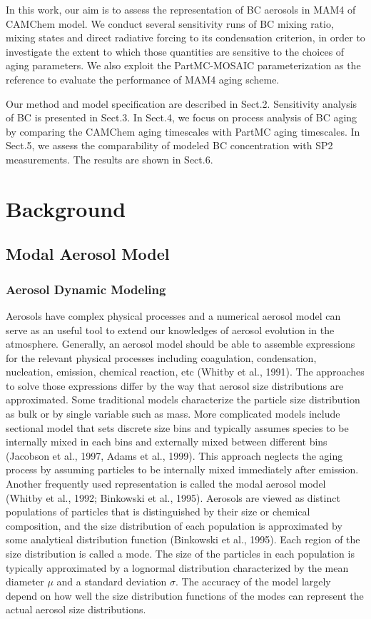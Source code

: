 \documentclass[12pt]{article}
\begin{document}
	In this work, our aim is to assess the representation of BC aerosols in MAM4 of CAMChem model. We conduct several sensitivity runs of BC mixing ratio, mixing states and direct radiative forcing to its condensation criterion, in order to investigate the extent to which those quantities are sensitive to the choices of aging parameters. We also exploit the PartMC-MOSAIC parameterization as the reference to evaluate the performance of MAM4 aging scheme. 

	Our method and model specification are described in Sect.2. Sensitivity analysis of BC is presented in Sect.3. In Sect.4, we focus on process analysis of BC aging by comparing the CAMChem aging timescales with PartMC aging timescales. In Sect.5, we assess the comparability of modeled BC concentration with SP2 measurements. The results are shown in Sect.6. 

	\section{Background}
	
	\subsection{Modal Aerosol Model}
	\subsubsection{Aerosol Dynamic Modeling}
	Aerosols have complex physical processes and a numerical aerosol model can serve as an useful tool to extend our knowledges of aerosol evolution in the atmosphere. Generally, an aerosol model should be able to assemble expressions for the relevant physical processes including coagulation, condensation, nucleation, emission, chemical reaction, etc (Whitby et al., 1991). The approaches to solve those expressions differ by the way that aerosol size distributions are approximated. Some traditional models characterize the particle size distribution as bulk or by single variable such as mass. More complicated models include sectional model that sets discrete size bins and typically assumes species to be internally mixed in each bins and externally mixed between different bins (Jacobson et al., 1997, Adams et al., 1999). This approach neglects the aging process by assuming particles to be internally mixed immediately after emission. Another frequently used representation is called the modal aerosol model (Whitby et al., 1992; Binkowski et al., 1995). Aerosols are viewed as distinct populations of particles that is distinguished by their size or chemical composition, and the size distribution of each population is approximated by some analytical distribution function (Binkowski et al., 1995). Each region of the size distribution is called a mode. The size of the particles in each population is typically approximated by a lognormal distribution characterized by the mean diameter $\mu$ and a standard deviation $\sigma$. The accuracy of the model largely depend on how well the size distribution functions of the modes can represent the actual aerosol size distributions.  
	
\end{document}

